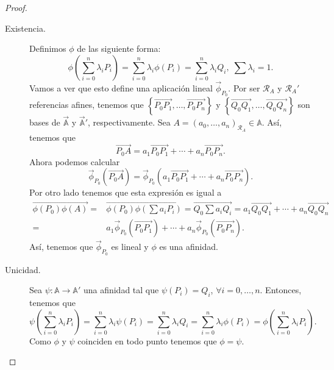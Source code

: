 \begin{proof}
\begin{description}
\item[Existencia.] Definimos $\displaystyle \phi $ de las siguiente forma: 
	\[\phi\left(\sum^{n}_{i=0}\lambda_{i}P_{i}\right) = \sum^{n}_{i = 0}\lambda_{i}\phi\left(P_{i}\right) = \sum^{n}_{i = 0}\lambda_{i}Q_{i}, \; \sum \lambda_{i} = 1 .\]
	Vamos a ver que esto define una aplicación lineal $\displaystyle \vec{\phi}_{P_{0}} $. Por ser $\displaystyle \mathcal{R}_{A} $ y $\displaystyle \mathcal{R}_{A}' $ referencias afines, tenemos que $\displaystyle \left\{ \overrightarrow{P_{0}P_{1}}, \ldots, \overrightarrow{P_{0}P_{n}}\right\}  $ y $\displaystyle \left\{ \overrightarrow{Q_{0}Q_{1}}, \ldots, \overrightarrow{Q_{0}Q_{n}}\right\}  $ son bases de $\displaystyle \vec{\mathbb{A}}$ y $\displaystyle \vec{\mathbb{A}}' $, respectivamente.
Sea $\displaystyle A = \left(a_{0}, \ldots, a_{n}\right)_{\mathcal{R}_{A}} \in \mathbb{A} $. Así, tenemos que
\[\overrightarrow{P_{0}A} = a_{1}\overrightarrow{P_{0}P_{1}} + \cdots + a_{n}\overrightarrow{P_{0}P_{n}} .\]
Ahora podemos calcular
\[\vec{\phi}_{P_{0}}\left(\overrightarrow{P_{0}A}\right) = \vec{\phi}_{P_{0}}\left(a_{1}\overrightarrow{P_{0}P_{1}} + \cdots + a_{n}\overrightarrow{P_{0}P_{n}}\right) .\]
Por otro lado tenemos que esta expresión es igual a
\[
\begin{split}
	\overrightarrow{\phi\left(P_{0}\right)\phi\left(A\right)} = & \overrightarrow{\phi\left(P_{0}\right)\phi\left(\sum a_{i}P_{i}\right)} = \overrightarrow{Q_{0}\sum a_{i}Q_{i}} = a_{1}\overrightarrow{Q_{0}Q_{1}} + \cdots + a_{n}\overrightarrow{Q_{0}Q_{n}} \\
	= & a_{1}\vec{\phi}_{P_{0}}\left(\overrightarrow{P_{0}P_{1}}\right) + \cdots + a_{n}\vec{\phi}_{P_{0}}\left(\overrightarrow{P_{0}P_{n}}\right).
\end{split}
\]
Así, tenemos que $\displaystyle \vec{\phi}_{P_{0}} $ es lineal y $\displaystyle \phi $ es una afinidad.
\item[Unicidad.] Sea $\displaystyle \psi : \mathbb{A} \to \mathbb{A}' $ una afinidad tal que $\displaystyle \psi\left(P_{i}\right) = Q_{i} $, $\displaystyle \forall i = 0, \ldots, n $. Entonces, tenemos que
	\[\psi\left(\sum^{n}_{i = 0}\lambda_{i}P_{i}\right) = \sum^{n}_{i = 0}\lambda_{i}\psi\left(P_{i}\right) = \sum^{n}_{i = 0}\lambda_{i}Q_{i} = \sum^{n}_{i = 0}\lambda_{i}\phi\left(P_{i}\right) = \phi\left(\sum^{n}_{i = 0}\lambda_{i}P_{i}\right) .\]
	Como $\displaystyle \phi $ y $\displaystyle \psi $ coinciden en todo punto tenemos que $\displaystyle \phi = \psi $. 
\end{description}
\end{proof}
